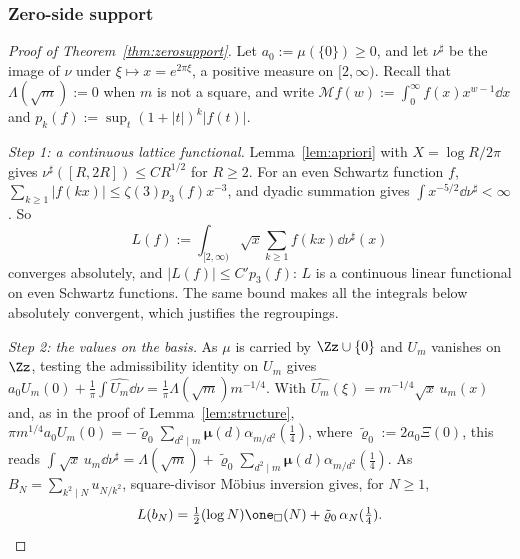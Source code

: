 \subsubsection{Zero-side support}\label{app:proofs-zerosupport}
\begin{proof}[Proof of Theorem~\textup{\ref{thm:zerosupport}}]
Let $a_0:=\mu(\{0\})\ge0$, and let $\nu^\sharp$ be the image of $\nu$ under $\xi\mapsto x=e^{2\pi\xi}$, a positive measure on $[2,\infty)$.
Recall that $\Lambda(\sqrt m):=0$ when $m$ is not a square, and write $\mathcal Mf(w):=\int_0^\infty f(x)x^{w-1}\dd x$ and
$p_k(f):=\sup_t(1+|t|)^k|f(t)|$.

\emph{Step 1: a continuous lattice functional.} Lemma~\ref{lem:apriori} with $X=\log R/2\pi$ gives $\nu^\sharp([R,2R])\le CR^{1/2}$ for
$R\ge2$. For an even Schwartz function $f$, $\sum_{k\ge1}|f(kx)|\le\zeta(3)p_3(f)x^{-3}$, and dyadic summation gives $\int x^{-5/2}\dd\nu^\sharp<\infty$.
So
\[
L(f):=\int_{[2,\infty)}\sqrt x\sum_{k\ge1}f(kx)\dd\nu^\sharp(x)
\]
converges absolutely, and $|L(f)|\le C'p_3(f)$: $L$ is a continuous linear functional on even Schwartz functions. The same bound makes all the
integrals below absolutely convergent, which justifies the regroupings.

\emph{Step 2: the values on the basis.} As $\mu$ is carried by $\Zz\cup\{0\}$ and $U_m$ vanishes on $\Zz$, testing the admissibility identity
on $U_m$ gives $a_0U_m(0)+\frac1\pi\int\widehat{U_m}\dd\nu=\frac1\pi\Lambda(\sqrt m)m^{-1/4}$. With
$\widehat{U_m}(\xi)=m^{-1/4}\sqrt x\,u_m(x)$ and, as in the proof of Lemma~\ref{lem:structure},
$\pi m^{1/4}a_0U_m(0)=-\tilde\varrho_0\sum_{d^2\mid m}\boldsymbol\mu(d)\alpha_{m/d^2}(\frac14)$, where $\tilde\varrho_0:=2a_0\Xi(0)$, this reads
$\int\sqrt x\,u_m\dd\nu^\sharp=\Lambda(\sqrt m)+\tilde\varrho_0\sum_{d^2\mid m}\boldsymbol\mu(d)\alpha_{m/d^2}(\frac14)$. As $B_N=\sum_{k^2\mid N}u_{N/k^2}$,
square-divisor M\"obius inversion gives, for $N\ge1$,
\begin{equation}\label{eq:L-bN}
L(b_N)=\tfrac12(\log N)\one_\square(N)+\tilde\varrho_0\,\alpha_N(\tfrac14).
\end{equation}


\end{proof}
